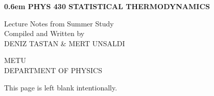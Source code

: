 \documentclass[a4paper,11pt, twoside]{report}
\begin{document}
\nocite{*}

\setlength{\skip\footins}{0.8cm}

\newcommand\nbvspace[1][3]{\vspace*{\stretch{#1}}}
\newcommand\nbstretchyspace{\spaceskip0.5em plus 0.25em minus 0.25em}
\newcommand{\nbtitlestretch}{\spaceskip0.6em}
\pagestyle{empty}

\begin{center}
\bfseries
\nbvspace[1]
\Huge
{\nbtitlestretch\huge
PHYS 430 STATISTICAL THERMODYNAMICS}

\nbvspace[1]
\normalsize

Lecture Notes from Summer Study\\

\nbvspace[1]
\small Compiled and Written by\\
\Large DENIZ TASTAN \& MERT UNSALDI\\[0.5em]


\nbvspace[2]

\nbvspace[3]
\normalsize

METU\\
\large
DEPARTMENT OF PHYSICS
\nbvspace[1]
\end{center}

\newpage

\tableofcontents

\newpage
\listoffigures
\newpage
\vspace*{\fill}
\begin{center}
    \LARGE
    This page is left blank intentionally.
\end{center}
\vspace*{\fill}
\newpage
\pagestyle{fancy}












\newpage

%
%
%
%

\newpage
{}
\end{document}
